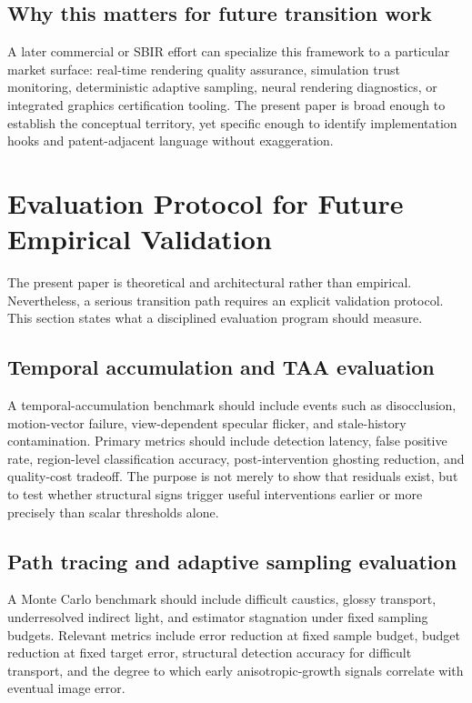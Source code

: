\documentclass[11pt]{article}
\theoremstyle{definition}
\theoremstyle{plain}
\begin{document}
\subsection{Why this matters for future transition work}
A later commercial or SBIR effort can specialize this framework to a particular market surface: real-time rendering quality assurance, simulation trust monitoring, deterministic adaptive sampling, neural rendering diagnostics, or integrated graphics certification tooling. The present paper is broad enough to establish the conceptual territory, yet specific enough to identify implementation hooks and patent-adjacent language without exaggeration.

\section{Evaluation Protocol for Future Empirical Validation}

The present paper is theoretical and architectural rather than empirical. Nevertheless, a serious transition path requires an explicit validation protocol. This section states what a disciplined evaluation program should measure.

\subsection{Temporal accumulation and TAA evaluation}
A temporal-accumulation benchmark should include events such as disocclusion, motion-vector failure, view-dependent specular flicker, and stale-history contamination. Primary metrics should include detection latency, false positive rate, region-level classification accuracy, post-intervention ghosting reduction, and quality-cost tradeoff. The purpose is not merely to show that residuals exist, but to test whether structural signs trigger useful interventions earlier or more precisely than scalar thresholds alone.

\subsection{Path tracing and adaptive sampling evaluation}
A Monte Carlo benchmark should include difficult caustics, glossy transport, underresolved indirect light, and estimator stagnation under fixed sampling budgets. Relevant metrics include error reduction at fixed sample budget, budget reduction at fixed target error, structural detection accuracy for difficult transport, and the degree to which early anisotropic-growth signals correlate with eventual image error.
\end{document}
